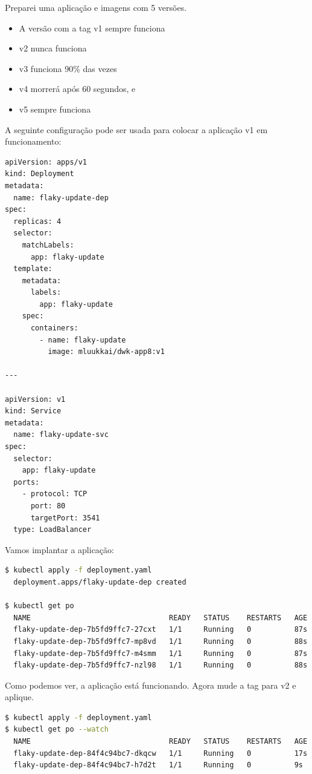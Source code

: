 \documentclass[11pt,a4paper]{article}
\begin{document}
Preparei uma aplicação e imagens com 5 versões.
\begin{itemize}
    \item A versão com a tag v1 sempre funciona
    \item v2 nunca funciona
    \item v3 funciona 90\% das vezes
    \item v4 morrerá após 60 segundos, e
    \item v5 sempre funciona
\end{itemize}

A seguinte configuração pode ser usada para colocar a aplicação v1 em funcionamento:

\begin{lstlisting}[language=bash]
apiVersion: apps/v1
kind: Deployment
metadata:
  name: flaky-update-dep
spec:
  replicas: 4
  selector:
    matchLabels:
      app: flaky-update
  template:
    metadata:
      labels:
        app: flaky-update
    spec:
      containers:
        - name: flaky-update
          image: mluukkai/dwk-app8:v1

---

apiVersion: v1
kind: Service
metadata:
  name: flaky-update-svc
spec:
  selector:
    app: flaky-update
  ports:
    - protocol: TCP
      port: 80
      targetPort: 3541
  type: LoadBalancer
\end{lstlisting}

Vamos implantar a aplicação:

\begin{lstlisting}[language=bash]
$ kubectl apply -f deployment.yaml
  deployment.apps/flaky-update-dep created

$ kubectl get po
  NAME                                READY   STATUS    RESTARTS   AGE
  flaky-update-dep-7b5fd9ffc7-27cxt   1/1     Running   0          87s
  flaky-update-dep-7b5fd9ffc7-mp8vd   1/1     Running   0          88s
  flaky-update-dep-7b5fd9ffc7-m4smm   1/1     Running   0          87s
  flaky-update-dep-7b5fd9ffc7-nzl98   1/1     Running   0          88s
\end{lstlisting}

Como podemos ver, a aplicação está funcionando. Agora mude a tag para v2 e aplique.

\begin{lstlisting}[language=bash]
$ kubectl apply -f deployment.yaml
$ kubectl get po --watch 
  NAME                                READY   STATUS    RESTARTS   AGE
  flaky-update-dep-84f4c94bc7-dkqcw   1/1     Running   0          17s
  flaky-update-dep-84f4c94bc7-h7d2t   1/1     Running   0          9s
\end{lstlisting}
\end{document}
